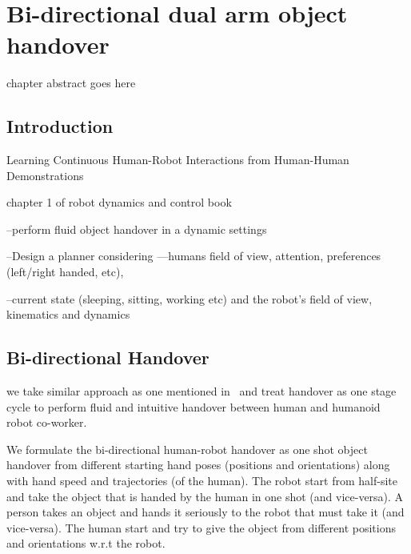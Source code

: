 \documentclass[a4paper, 12pt, oneside]{Thesis}  %
\begin{document}

\chapter{Bi-directional dual arm object handover}

chapter abstract goes here


\clearpage
\section{Introduction}

Learning Continuous Human-Robot Interactions from Human-Human Demonstrations ~\cite{vogt2017system}

chapter 1 of robot dynamics and control book~\cite{spong2008robot}

--perform fluid object handover in a dynamic settings

--Design a planner considering —humans field of view, attention, preferences (left/right handed, etc),

--current state (sleeping, sitting, working etc) and the robot’s field of view, kinematics and dynamics



\clearpage
\section{Bi-directional Handover}

we take similar approach as one mentioned in~\cite{medina2016human} and treat handover as one stage cycle to perform fluid and intuitive handover between human and humanoid robot co-worker.

We formulate the bi-directional human-robot handover as one shot object handover from different starting hand poses (positions and orientations) along with hand speed and trajectories (of the human). The robot start from half-site and take the object that is handed by the human in one shot (and vice-versa). A person takes an object and hands it seriously to the robot that must take it (and vice-versa). The human start and try to give the object from different positions and orientations w.r.t the robot.
\end{document}
